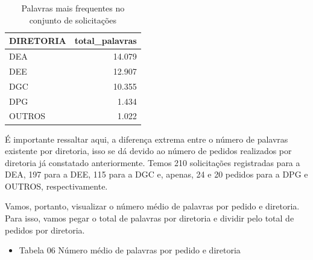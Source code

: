 \documentclass[]{article}
\newenvironment{Shaded}{\begin{snugshade}}{\end{snugshade}}
\newcommand{\KeywordTok}[1]{\textcolor[rgb]{0.13,0.29,0.53}{\textbf{#1}}}
\newcommand{\DataTypeTok}[1]{\textcolor[rgb]{0.13,0.29,0.53}{#1}}
\newcommand{\DecValTok}[1]{\textcolor[rgb]{0.00,0.00,0.81}{#1}}
\newcommand{\StringTok}[1]{\textcolor[rgb]{0.31,0.60,0.02}{#1}}
\newcommand{\OperatorTok}[1]{\textcolor[rgb]{0.81,0.36,0.00}{\textbf{#1}}}
\newcommand{\NormalTok}[1]{#1}
\providecommand{\tightlist}{%
  \setlength{\itemsep}{0pt}\setlength{\parskip}{0pt}}
\begin{document}
\begin{table}[!h]

\caption{\label{tab:unnamed-chunk-23}Palavras mais frequentes no conjunto de solicitações}
\centering
\begin{tabular}{lr}
\toprule
DIRETORIA & total\_palavras\\
\midrule
\rowcolor{gray!6}  DEA & 14.079\\
DEE & 12.907\\
\rowcolor{gray!6}  DGC & 10.355\\
DPG & 1.434\\
\rowcolor{gray!6}  OUTROS & 1.022\\
\bottomrule
\end{tabular}
\end{table}

É importante ressaltar aqui, a diferença extrema entre o número de
palavras existente por diretoria, isso se dá devido ao número de pedidos
realizados por diretoria já constatado anteriormente. Temos 210
solicitações registradas para a DEA, 197 para a DEE, 115 para a DGC e,
apenas, 24 e 20 pedidos para a DPG e OUTROS, respectivamente.

Vamos, portanto, visualizar o número médio de palavras por pedido e
diretoria. Para isso, vamos pegar o total de palavras por diretoria e
dividir pelo total de pedidos por diretoria.

\begin{Shaded}
\end{Shaded}

\begin{itemize}
\tightlist
\item
  Tabela 06 Número médio de palavras por pedido e diretoria
\end{itemize}
\end{document}
